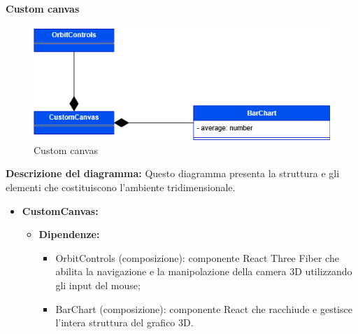 \paragraph{Custom canvas}
\begin{figure}[h!] \centering
    \includegraphics[scale=0.45]{template/images/uml_front/ui/customcanvas.png}
    \caption{Custom canvas}
\end{figure}
\textbf{Descrizione del diagramma:}
Questo diagramma presenta la struttura e gli elementi che costituiscono l'ambiente tridimensionale.
\begin{itemize}
    \item \textbf{CustomCanvas:}
    \begin{itemize}
        \item \textbf{Dipendenze:}
        \begin{itemize}
            \item OrbitControls (composizione): componente React Three Fiber che abilita la navigazione e la manipolazione della camera 3D utilizzando gli input del mouse;
            \item BarChart (composizione): componente React che racchiude e gestisce l'intera struttura del grafico 3D.
        \end{itemize} 
    \end{itemize}
\end{itemize}

\pagebreak

